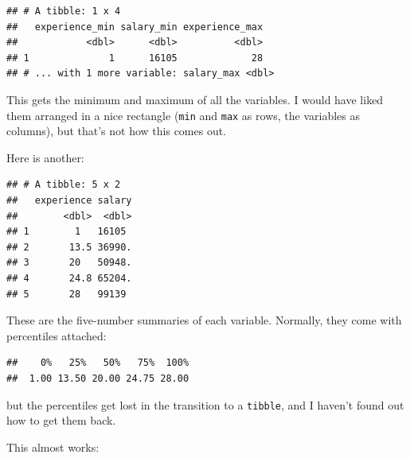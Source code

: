 \documentclass[]{tufte-book}
\newenvironment{Shaded}{}{}
\newcommand{\KeywordTok}[1]{\textcolor[rgb]{0.00,0.44,0.13}{\textbf{#1}}}
\newcommand{\NormalTok}[1]{#1}
\newcommand{\OperatorTok}[1]{\textcolor[rgb]{0.40,0.40,0.40}{#1}}
\newcommand{\StringTok}[1]{\textcolor[rgb]{0.25,0.44,0.63}{#1}}
\theoremstyle{definition}
\theoremstyle{definition}
\theoremstyle{definition}
\theoremstyle{remark}
\begin{document}
\begin{verbatim}
## # A tibble: 1 x 4
##   experience_min salary_min experience_max
##            <dbl>      <dbl>          <dbl>
## 1              1      16105             28
## # ... with 1 more variable: salary_max <dbl>
\end{verbatim}

This gets the minimum and maximum of all the variables. I would have
liked them arranged in a nice rectangle (\texttt{min} and \texttt{max}
as rows, the variables as columns), but that's not how this comes out.

Here is another:

\begin{Shaded}
\end{Shaded}

\begin{verbatim}
## # A tibble: 5 x 2
##   experience salary
##        <dbl>  <dbl>
## 1        1   16105 
## 2       13.5 36990.
## 3       20   50948.
## 4       24.8 65204.
## 5       28   99139
\end{verbatim}

These are the five-number summaries of each variable. Normally, they
come with percentiles attached:

\begin{Shaded}
\end{Shaded}

\begin{verbatim}
##    0%   25%   50%   75%  100% 
##  1.00 13.50 20.00 24.75 28.00
\end{verbatim}

but the percentiles get lost in the transition to a \texttt{tibble}, and
I haven't found out how to get them back.

This almost works:

\begin{Shaded}
\end{Shaded}
\end{document}
